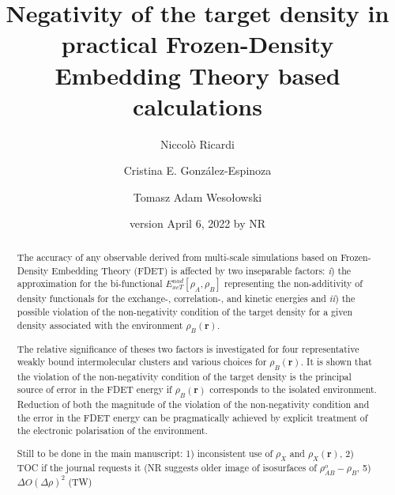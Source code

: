 \documentclass[amsmath,amssymb,preprint,aip,jcp]{revtex4-1}
\begin{document}
\author{Niccol\`{o} Ricardi}
\author{Cristina E. Gonz\'{a}lez-Espinoza}
\author{Tomasz Adam Weso\l{}owski}
% 
\date{version April 6, 2022 by NR}
\title{Negativity of the target density in practical Frozen-Density Embedding Theory based calculations}

\begin{abstract}
The accuracy of any observable derived from multi-scale simulations based on Frozen-Density Embedding Theory (FDET) is affected by two inseparable factors: {\it i}) the approximation for the bi-functional ${E}_{xcT}^{nad}[\rho_A,\rho_B]$ representing the non-additivity of density functionals for the exchange-, correlation-, and kinetic  energies and  {\it ii}) the possible violation of the non-negativity condition of the target density for a given density associated with the environment $\rho_B(\mathbf{r})$.

The relative significance of theses two factors is investigated for four representative weakly bound intermolecular clusters and various choices for $\rho_B(\mathbf{r})$.
It is shown that  the violation of the non-negativity condition of the target density is the principal source of error in the FDET energy
if $\rho_B(\mathbf{r})$ corresponds to the isolated environment.
Reduction of both the magnitude of the violation of the non-negativity condition and the error in the FDET energy can be pragmatically achieved by explicit treatment of the electronic polarisation of the environment.

{\color{red} Still to be done in the main manuscript:
1) inconsistent use of $\rho_X$ and $\rho_X(\mathbf{r})$, 
2) TOC if the journal requests it (NR suggests older image of isosurfaces of $\rho_{AB}^o -\rho_B$,
5) $\Delta O(\Delta\rho)^2$ (TW)
} 
\end{abstract}

\maketitle
\end{document}
